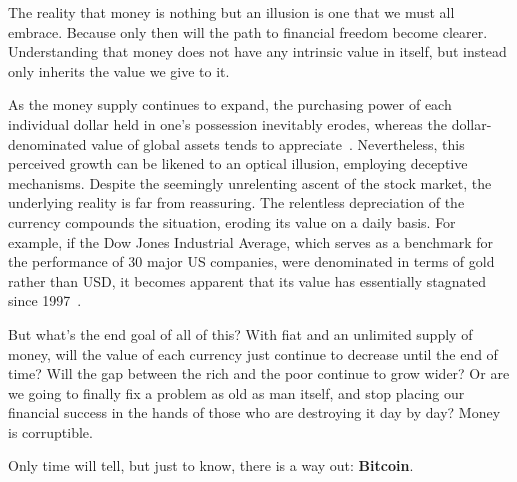 The reality that money is nothing but an illusion is one that we must all embrace. Because only then will the path to financial freedom become
clearer. Understanding that money does not have any intrinsic value in itself, but instead only inherits the value we give to it.

As the money supply continues to expand, the purchasing power of each individual dollar held in one's possession inevitably erodes, whereas the
dollar-denominated value of global assets tends to appreciate~\cite{moneyprinting}. Nevertheless, this perceived growth can be likened to an
optical illusion, employing deceptive mechanisms. Despite the seemingly unrelenting ascent of the stock market, the underlying reality is far
from reassuring. The relentless depreciation of the currency compounds the situation, eroding its value on a daily basis. For example, if the
Dow Jones Industrial Average, which serves as a benchmark for the performance of 30 major US companies, were denominated in terms of gold rather
than USD, it becomes apparent that its value has essentially stagnated since 1997~\cite{stockmarketillusion}.

But what's the end goal of all of this? With fiat and an unlimited supply of money, will the value of each currency just continue to decrease
until the end of time? Will the gap between the rich and the poor continue to grow wider? Or are we going to finally fix a problem as old as
man itself, and stop placing our financial success in the hands of those who are destroying it day by day? Money is corruptible.

Only time will tell, but just to know, there is a way out: \textbf{Bitcoin}.
